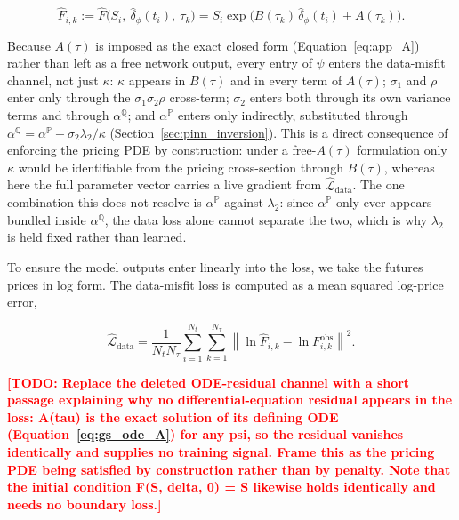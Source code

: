 \documentclass[11pt, a4paper]{article}
\newcommand{\todo}[1]{\textcolor{red}{\textbf{[TODO: #1]}}}
\begin{document}
\begin{equation}
    \hat{F}_{i,k} := \hat{F}\big( S_i,\ \hat{\delta}_\phi(t_i),\ \tau_k \big)
    = S_i \exp\!\big( B(\tau_k)\,\hat{\delta}_\phi(t_i) + A(\tau_k) \big).
    \label{eq:fik-def}
\end{equation}

Because $A(\tau)$ is imposed as the exact closed form (Equation~\ref{eq:app_A})
rather than left as a free network output, every entry of $\psi$ enters the
data-misfit channel, not just $\kappa$: $\kappa$ appears in $B(\tau)$ and in
every term of $A(\tau)$; $\sigma_1$ and $\rho$ enter only through the
$\sigma_1\sigma_2\rho$ cross-term; $\sigma_2$ enters both through its own
variance terms and through $\alpha^{\mathbb{Q}}$; and $\alpha^{\mathbb{P}}$
enters only indirectly, substituted through
$\alpha^{\mathbb{Q}} = \alpha^{\mathbb{P}} - \sigma_2\lambda_2/\kappa$
(Section~\ref{sec:pinn_inversion}). This is a direct consequence of enforcing
the pricing PDE by construction: under a free-$A(\tau)$ formulation only
$\kappa$ would be identifiable from the pricing cross-section through
$B(\tau)$, whereas here the full parameter vector carries a live gradient
from $\hat{\mathcal{L}}_{\text{data}}$. The one combination this does not
resolve is $\alpha^{\mathbb{P}}$ against $\lambda_2$: since $\alpha^{\mathbb{P}}$
only ever appears bundled inside $\alpha^{\mathbb{Q}}$, the data loss alone
cannot separate the two, which is why $\lambda_2$ is held fixed rather than
learned.

To ensure the model outputs
enter linearly into the loss, we take the futures prices in log form. The
data-misfit loss is computed as a mean squared log-price error,

\begin{equation}
\hat{\mathcal{L}}_{\text{data}} = \frac{1}{N_t N_\tau} \sum_{i=1}^{N_t} \sum_{k=1}^{N_\tau}
\left\lVert \ln \hat{F}_{i,k} - \ln F^{\text{obs}}_{i,k} \right\rVert^2.
\label{eq:data-loss}
\end{equation}

\todo{Replace the deleted ODE-residual channel with a short passage explaining
  why no differential-equation residual appears in the loss: A(tau) is the exact
  solution of its defining ODE (Equation~\ref{eq:gs_ode_A}) for any psi, so the
  residual vanishes identically and supplies no training signal. Frame this as
  the pricing PDE being satisfied by construction rather than by penalty. Note
  that the initial condition F(S, delta, 0) = S likewise holds identically and
  needs no boundary loss.}
\end{document}
